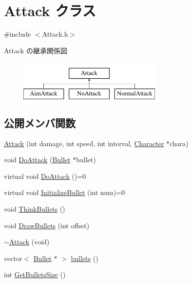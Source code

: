 \hypertarget{class_attack}{\section{Attack クラス}
\label{class_attack}
}


{\ttfamily \#include $<$Attack.\+h$>$}

Attack の継承関係図\begin{figure}[H]
\begin{center}
\leavevmode
\includegraphics[height=2.000000cm]{class_attack}
\end{center}
\end{figure}
\subsection*{公開メンバ関数}
\begin{DoxyCompactItemize}
\item 
\hyperlink{class_attack_a7bfe78a7f5c0f41fad5e87f1cae7f6a5}{Attack} (int damage, int speed, int interval, \hyperlink{class_character}{Character} $\ast$chara)
\item 
void \hyperlink{class_attack_af2ea0dae02dde12d3fd31f10ceb374d0}{Do\+Attack} (\hyperlink{class_bullet}{Bullet} $\ast$bullet)
\item 
virtual void \hyperlink{class_attack_a06d145ff7c11cfef2b688eefcd11dac1}{Do\+Attack} ()=0
\item 
virtual void \hyperlink{class_attack_ac02b84493ca19adf8425c1ed2efaf54c}{Initialize\+Bullet} (int num)=0
\item 
void \hyperlink{class_attack_a60e57896cd31f3735746e2881f41f689}{Think\+Bullets} ()
\item 
void \hyperlink{class_attack_a82056bd6da4f30f961df75642cf6b2a6}{Draw\+Bullets} (int offset)
\item 
\hyperlink{class_attack_a178107a2b20a45b02adfdec72269711c}{$\sim$\+Attack} (void)
\item 
vector$<$ \hyperlink{class_bullet}{Bullet} $\ast$ $>$ \hyperlink{class_attack_ad6c6c719f3a56fafdf515394cc92869f}{bullets} ()
\item 
int \hyperlink{class_attack_aaa4045e8fe9f2ce9b3f473d3bf869c87}{Get\+Bullets\+Size} ()
\end{DoxyCompactItemize}

